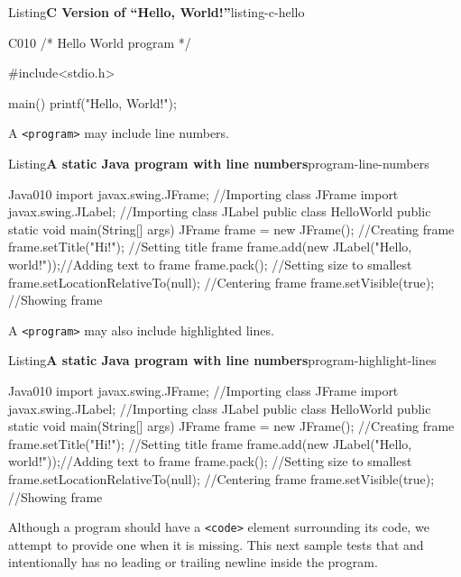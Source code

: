 \documentclass{amsart}
\theoremstyle{plain}%
\theoremstyle{definition}%
\theoremstyle{remark}%
\newcommand{\mono}[1]{\texttt{#1}}
\numberwithin{equation}{section}
\begin{document}
\begin{listingptx}{Listing}{\textbf{C Version of ``Hello, World!''}}{listing-c-hello}{}%
\begin{program}{C}{0}{1}{0}
/* Hello World program */

#include<stdio.h>

main()
{
    printf("Hello, World!");
}
\end{program}
\end{listingptx}%
A \mono{<program>} may include line numbers.%
\begin{listingptx}{Listing}{\textbf{A static Java program with line numbers}}{program-line-numbers}{}%
\begin{programnumbered}{Java}{0}{1}{0}
import javax.swing.JFrame;  //Importing class JFrame
import javax.swing.JLabel;  //Importing class JLabel
public class HelloWorld {
    public static void main(String[] args) {
        JFrame frame = new JFrame();           //Creating frame
        frame.setTitle("Hi!");                 //Setting title frame
        frame.add(new JLabel("Hello, world!"));//Adding text to frame
        frame.pack();                          //Setting size to smallest
        frame.setLocationRelativeTo(null);     //Centering frame
        frame.setVisible(true);                //Showing frame
    }
}
\end{programnumbered}
\end{listingptx}%
A \mono{<program>} may also include highlighted lines.%
\begin{listingptx}{Listing}{\textbf{A static Java program with line numbers}}{program-highlight-lines}{}%
\begin{programnumbered}{Java}{0}{1}{0}
import javax.swing.JFrame;  //Importing class JFrame
import javax.swing.JLabel;  //Importing class JLabel
public class HelloWorld {
    public static void main(String[] args) {
        JFrame frame = new JFrame();           //Creating frame
        frame.setTitle("Hi!");                 //Setting title frame
        frame.add(new JLabel("Hello, world!"));//Adding text to frame
        frame.pack();                          //Setting size to smallest
        frame.setLocationRelativeTo(null);     //Centering frame
        frame.setVisible(true);                //Showing frame
    }
}
\end{programnumbered}
\end{listingptx}%
Although a program should have a \mono{<code>} element surrounding its code, we attempt to provide one when it is missing. This next sample tests that and intentionally has no leading or trailing newline inside the program.%
\end{document}
